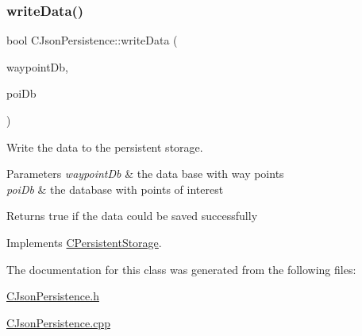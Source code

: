 \mbox{\label{classCJsonPersistence_acd18e844bf7ec52ba1ec265ea2767dcb}} 
\subsubsection{\texorpdfstring{write\+Data()}{writeData()}}
{\footnotesize\ttfamily bool C\+Json\+Persistence\+::write\+Data (\begin{DoxyParamCaption}\item[{const \hyperlink{classCWpDatabase}{C\+Wp\+Database} \&}]{waypoint\+Db,  }\item[{const \hyperlink{classCPoiDatabase}{C\+Poi\+Database} \&}]{poi\+Db }\end{DoxyParamCaption})\hspace{0.3cm}{\ttfamily [virtual]}}

Write the data to the persistent storage.


\begin{DoxyParams}{Parameters}
{\em waypoint\+Db} & the data base with way points \\
\hline
{\em poi\+Db} & the database with points of interest \\
\hline
\end{DoxyParams}
\begin{DoxyReturn}{Returns}
true if the data could be saved successfully 
\end{DoxyReturn}


Implements \hyperlink{classCPersistentStorage_ab0c03dbf674c6218d574289ec54a75ed}{C\+Persistent\+Storage}.



The documentation for this class was generated from the following files\+:\begin{DoxyCompactItemize}
\item 
\hyperlink{CJsonPersistence_8h}{C\+Json\+Persistence.\+h}\item 
\hyperlink{CJsonPersistence_8cpp}{C\+Json\+Persistence.\+cpp}\end{DoxyCompactItemize}

